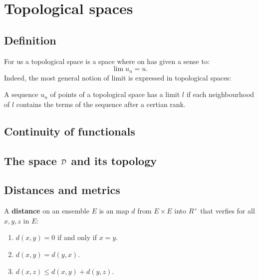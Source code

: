\documentclass[12pt]{book}
\begin{document}
\chapter{Topological spaces}

\section{Definition}

For us a topological space is a space where on has given a sense to:
\begin{equation}
\lim u_n=u.
\end{equation}
Indeed, the most general notion of limit is expressed in topological
spaces:



\begin{defn}
A sequence $u_n$ of points of a topological space has a limit $l$ if
each neighbourhood of $l$ contains the terms of the sequence after a
certian rank.
\end{defn}



\section{Continuity of functionals}


\section{The space ${\cal D}$ and its topology}



\section{Distances and metrics}

\begin{defn}
A {\bf distance} on an ensemble $E$ is an map $d$ from $E\times E$ into
$R^+$ that verfies for all $x,y,z$ in $E$:
\begin{enumerate}
\item $d(x,y)=0$ if and only if $x=y$.
\item $d(x,y)=d(y,x)$.
\item $d(x,z)\leq d(x,y)+d(y,z)$.
\end{enumerate}

\end{defn}
\end{document}
